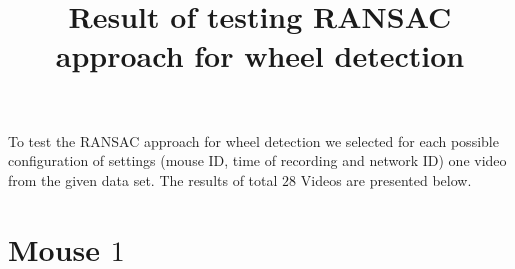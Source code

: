 \documentclass[
	fontsize=12pt,
	paper=a4,
	twoside=false,
	numbers=noenddot,
	plainheadsepline,
	toc=listof,
	toc=bibliography
]{scrartcl}
\title{Result of testing RANSAC approach for wheel detection}
\begin{document}
\maketitle


To test the RANSAC approach for wheel detection we selected for each possible configuration of settings (mouse ID, time of recording and network ID) one video from the given data set. The results of total $28$ Videos are presented below.

\section*{Mouse $1$}

\end{document}
